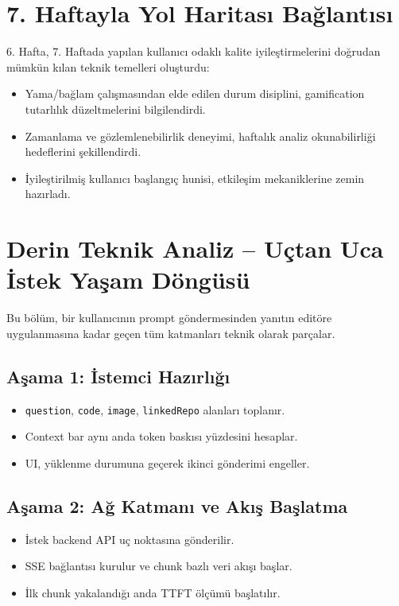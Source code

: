 \documentclass[12pt,a4paper]{article}
\begin{document}
\section{7. Haftayla Yol Haritası Bağlantısı}

6. Hafta, 7. Haftada yapılan kullanıcı odaklı kalite iyileştirmelerini doğrudan mümkün kılan teknik temelleri oluşturdu:
\begin{itemize}[leftmargin=*]
  \item Yama/bağlam çalışmasından elde edilen durum disiplini, gamification tutarlılık düzeltmelerini bilgilendirdi.
  \item Zamanlama ve gözlemlenebilirlik deneyimi, haftalık analiz okunabilirliği hedeflerini şekillendirdi.
  \item İyileştirilmiş kullanıcı başlangıç hunisi, etkileşim mekaniklerine zemin hazırladı.
\end{itemize}

\section{Derin Teknik Analiz -- Uçtan Uca İstek Yaşam Döngüsü}

Bu bölüm, bir kullanıcının prompt göndermesinden yanıtın editöre uygulanmasına kadar geçen tüm katmanları teknik olarak parçalar.

\subsection{Aşama 1: İstemci Hazırlığı}
\begin{itemize}[leftmargin=*]
  \item \texttt{question}, \texttt{code}, \texttt{image}, \texttt{linkedRepo} alanları toplanır.
  \item Context bar aynı anda token baskısı yüzdesini hesaplar.
  \item UI, yüklenme durumuna geçerek ikinci gönderimi engeller.
\end{itemize}

\subsection{Aşama 2: Ağ Katmanı ve Akış Başlatma}
\begin{itemize}[leftmargin=*]
  \item İstek backend API uç noktasına gönderilir.
  \item SSE bağlantısı kurulur ve chunk bazlı veri akışı başlar.
  \item İlk chunk yakalandığı anda TTFT ölçümü başlatılır.
\end{itemize}
\end{document}
